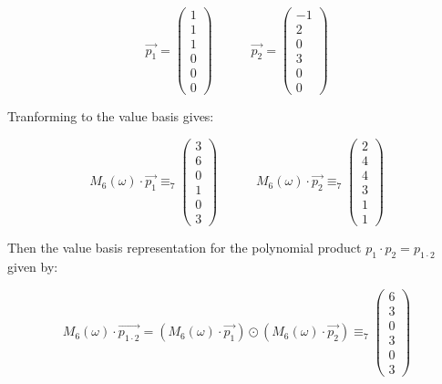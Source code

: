 \documentclass[10pt]{article}
\begin{document}
\begin{solution}
\begin{enumerate}[(a)]
{            \[
                \vec{p_1} = 
                \begin{pmatrix} 
                    1 \\
                    1 \\
                    1 \\
                    0 \\
                    0 \\
                    0
                \end{pmatrix}
                \quad\quad\quad
                \vec{p_2} = 
                \begin{pmatrix} 
                    -1 \\
                    2 \\
                    0 \\
                    3 \\
                    0 \\
                    0
                \end{pmatrix}
            \]

            Tranforming to the value basis gives:

            \[
                M_6(\omega) \cdot \vec{p_1} \equiv_7
                \begin{pmatrix} 
                    3 \\
                    6 \\
                    0 \\
                    1 \\
                    0 \\
                    3
                \end{pmatrix}
                \quad\quad\quad
                M_6(\omega) \cdot \vec{p_2} \equiv_7
                \begin{pmatrix} 
                    2 \\
                    4 \\
                    4 \\
                    3 \\
                    1 \\
                    1
                \end{pmatrix}
            \]

            Then the value basis representation for the polynomial product $p_1 \cdot p_2 = p_{1 \cdot 2}$ given by:

            \[
                M_6(\omega) \cdot \vec{p_{1 \cdot 2}} = 
                (M_6(\omega) \cdot \vec{p_1}) \odot (M_6(\omega) \cdot \vec{p_2}) \equiv_7
                \begin{pmatrix} 
                    6 \\
                    3 \\
                    0 \\
                    3 \\
                    0 \\
                    3
                \end{pmatrix}
            \]

}
\end{enumerate}
\end{solution}
\end{document}
